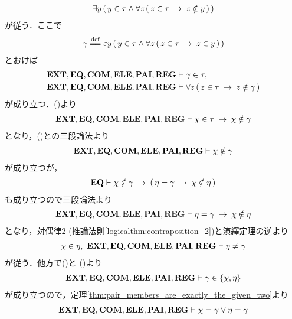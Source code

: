 \begin{sketch}
\begin{align}
			\exists y\, (\, y \in \tau \wedge \forall z\, (\, z \in \tau 
			\hspace{0.25em}\rightarrow\hspace{0.25em} z \notin y\, )\, )
		\end{align}
		が従う．ここで
		\begin{align}
			\gamma \defeq \varepsilon y\, (\, y \in \tau \wedge \forall z\, (\, z \in \tau \rarrow z \in y\, )\, )
		\end{align}
		とおけば
		\begin{align}
			\mbox{{\bf EXT}},\mbox{{\bf EQ}},\mbox{\bf COM},\mbox{{\bf ELE}},\mbox{{\bf PAI}},\mbox{{\bf REG}} &\vdash \gamma \in \tau, 
			\label{fom:no_pair_of_sets_go_round_4} \\
			\mbox{{\bf EXT}},\mbox{{\bf EQ}},\mbox{\bf COM},\mbox{{\bf ELE}},\mbox{{\bf PAI}},\mbox{{\bf REG}} &\vdash \forall z\, (\, z \in \tau \hspace{0.25em}\rightarrow\hspace{0.25em} z \notin \gamma\, )
			\label{fom:no_pair_of_sets_go_round_5}
		\end{align}
		が成り立つ．()より
		\begin{align}
			\mbox{{\bf EXT}},\mbox{{\bf EQ}},\mbox{\bf COM},\mbox{{\bf ELE}},\mbox{{\bf PAI}},\mbox{{\bf REG}} \vdash 
			\chi \in \tau \hspace{0.25em}\rightarrow\hspace{0.25em} \chi \notin \gamma
		\end{align}
		となり，()との三段論法より
		\begin{align}
			\mbox{{\bf EXT}},\mbox{{\bf EQ}},\mbox{\bf COM},\mbox{{\bf ELE}},\mbox{{\bf PAI}},\mbox{{\bf REG}} \vdash \chi \notin \gamma
			\label{fom:no_pair_of_sets_go_round_8}
		\end{align}
		が成り立つが，
		\begin{align}
			\mbox{{\bf EQ}} \vdash \chi \notin \gamma \hspace{0.25em}\rightarrow\hspace{0.25em} 
			(\, \eta = \gamma \hspace{0.25em}\rightarrow\hspace{0.25em} \chi \notin \eta\, )
		\end{align}
		も成り立つので三段論法より
		\begin{align}
			\mbox{{\bf EXT}},\mbox{{\bf EQ}},\mbox{\bf COM},\mbox{{\bf ELE}},\mbox{{\bf PAI}},\mbox{{\bf REG}} \vdash 
			\eta = \gamma \hspace{0.25em}\rightarrow\hspace{0.25em} \chi \notin \eta
		\end{align}
		となり，対偶律2 (推論法則\ref{logicalthm:contraposition_2})と演繹定理の逆より
		\begin{align}
			\chi \in \eta,\ \mbox{{\bf EXT}},\mbox{{\bf EQ}},\mbox{\bf COM},\mbox{{\bf ELE}},\mbox{{\bf PAI}},\mbox{{\bf REG}} \vdash 
			\eta \neq \gamma
			\label{fom:no_pair_of_sets_go_round_7}
		\end{align}
		が従う．他方で()と
		()より
		\begin{align}
			\mbox{{\bf EXT}},\mbox{{\bf EQ}},\mbox{\bf COM},\mbox{{\bf ELE}},\mbox{{\bf PAI}},\mbox{{\bf REG}} \vdash \gamma \in \{\chi,\eta\}
		\end{align}
		が成り立つので，定理\ref{thm:pair_members_are_exactly_the_given_two}より
		\begin{align}
			\EXTAX,\EQAX,\COMAX,\ELEAX,\PAIAX,\REGAX \vdash \chi = \gamma \vee \eta = \gamma

\end{align}
\end{sketch}
